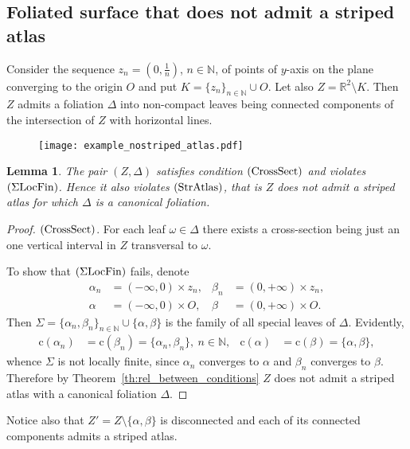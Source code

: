 \documentclass[12pt, reqno]{amsart}
\newcommand{\sublemmaname}{Lemma}%
\newtheorem{sublemma}[subsubsection]{\protect\sublemmaname}
\newcommand{\bR}{\mathbb{R}}
\newcommand{\bN}{\mathbb{N}}
\newcommand{\Partition}{\Delta}
\newcommand{\leaf}{\omega}
\newcommand{\stripSurf}{Z}
\newcommand\hcl[1]{\mathrm{c}(#1)}
\begin{document}
\subsection{Foliated surface that does not admit a striped atlas}
Consider the sequence $z_n = (0,\tfrac{1}{n})$, $n\in\bN$, of points of $y$-axis on the plane converging to the origin $O$ and put
$K =\{z_n\}_{n\in\bN} \cup O$.
Let also $\stripSurf = \bR^2\setminus K$.
Then $\stripSurf$ admits a foliation $\Partition$ into non-compact leaves being connected components of the intersection of $\stripSurf$ with horizontal lines.
\begin{figure}[h]
\texttt{[image: example\_nostriped\_atlas.pdf]}
\caption{}\label{fig:example_nostriped_atlas}
\end{figure}
\begin{sublemma}\label{lm:example_of_non-striped_surface}
The pair $(\stripSurf,\Partition)$ satisfies condition $\mathrm{(CrossSect)}$ and violates $\mathrm{(\Sigma LocFin)}$.
Hence it also violates $\mathrm{(StrAtlas)}$, that is $\stripSurf$ does not admit a striped atlas for which $\Partition$ is a canonical foliation.
\end{sublemma}
\begin{proof}
$\mathrm{(CrossSect)}$.
For each leaf $\leaf\in\Partition$ there exists a cross-section being just an one vertical interval in $\stripSurf$ transversal to $\leaf$.

To show that $\mathrm{(\Sigma LocFin)}$ fails, denote 
\begin{align*}
\alpha_{n} &= (-\infty,0) \times z_n, &
\beta_{n} &= (0, +\infty) \times z_n, \\
\alpha &= (-\infty,0) \times O, &
\beta &= (0, +\infty) \times O.
\end{align*}
Then $\Sigma = \{ \alpha_{n}, \beta_{n}\}_{n\in\bN} \cup \{ \alpha, \beta\}$ is the family of all special leaves of $\Partition$.
Evidently,
\begin{align*}
\hcl{\alpha_n}&=\hcl{\beta_n}=\{ \alpha_n, \beta_n\}, \ n\in\bN, &
\hcl{\alpha}&=\hcl{\beta}=\{ \alpha, \beta\},
\end{align*}
whence $\Sigma$ is not locally finite, since $\alpha_n$ converges to $\alpha$ and $\beta_n$ converges to $\beta$.
Therefore by Theorem~\ref{th:rel_between_conditions} $\stripSurf$ does not admit a striped atlas with a canonical foliation $\Partition$.
\end{proof}

Notice also that $\stripSurf'=\stripSurf\setminus\{\alpha,\beta\}$ is disconnected and each of its connected components admits a striped atlas.
\end{document}
